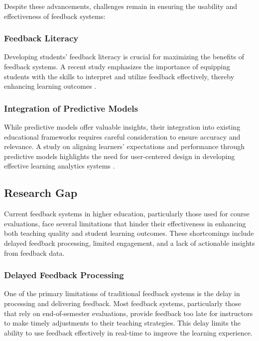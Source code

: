 \documentclass[conference]{IEEEtran}
\begin{document}
Despite these advancements, challenges remain in ensuring the usability and effectiveness of feedback systems:

\subsubsection{Feedback Literacy}

Developing students' feedback literacy is crucial for maximizing the benefits of feedback systems. A recent study emphasizes the importance of equipping students with the skills to interpret and utilize feedback effectively, thereby enhancing learning outcomes \cite{Nieminen2023}.

\subsubsection{Integration of Predictive Models}

While predictive models offer valuable insights, their integration into existing educational frameworks requires careful consideration to ensure accuracy and relevance. A study on aligning learners' expectations and performance through predictive models highlights the need for user-centered design in developing effective learning analytics systems \cite{bdcc8120187}.

\subsection{Research Gap}

Current feedback systems in higher education, particularly those used for course evaluations, face several limitations that hinder their effectiveness in enhancing both teaching quality and student learning outcomes. These shortcomings include delayed feedback processing, limited engagement, and a lack of actionable insights from feedback data.

\subsubsection{Delayed Feedback Processing}
One of the primary limitations of traditional feedback systems is the delay in processing and delivering feedback. Most feedback systems, particularly those that rely on end-of-semester evaluations, provide feedback too late for instructors to make timely adjustments to their teaching strategies. This delay limits the ability to use feedback effectively in real-time to improve the learning experience.
\end{document}
